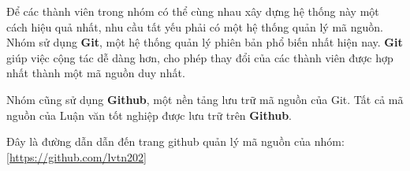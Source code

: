 Để các thành viên trong nhóm có thể cùng nhau xây dựng hệ thống này một cách hiệu quả nhất, nhu cầu tất yếu phải có một hệ thống quản lý mã nguồn. Nhóm sử dụng \textbf{Git}, một hệ thống quản lý phiên bản phổ biến nhất hiện nay. \textbf{Git} giúp việc cộng tác dễ dàng hơn, cho phép thay đổi của các thành viên được hợp nhất thành một mã nguồn duy nhất.\par

Nhóm cũng sử dụng \textbf{Github}, một nền tảng lưu trữ mã nguồn của Git. Tất cả mã nguồn của Luận văn tốt nghiệp được lưu trữ trên \textbf{Github}.

Đây là đường dẫn dẫn đến trang github quản lý mã nguồn của nhóm: \href{https://github.com/lvtn202}{[https://github.com/lvtn202]}